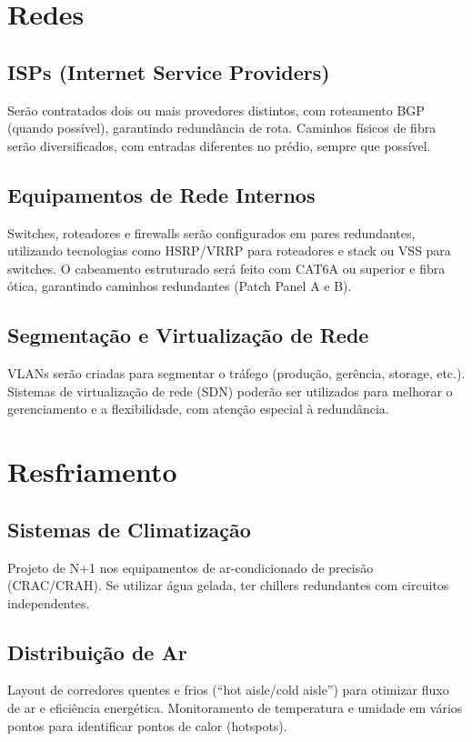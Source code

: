 \documentclass[
	12pt,				%
	oneside,			%
	a4paper,			%
	english,			%
	brazil				%
	]{abntex2unama}
\begin{document}
\section{Redes}
\subsection{ISPs (Internet Service Providers)}
Serão contratados dois ou mais provedores distintos, com roteamento BGP (quando possível), garantindo redundância de rota. Caminhos físicos de fibra serão diversificados, com entradas diferentes no prédio, sempre que possível.

\subsection{Equipamentos de Rede Internos}
Switches, roteadores e firewalls serão configurados em pares redundantes, utilizando tecnologias como HSRP/VRRP para roteadores e stack ou VSS para switches. O cabeamento estruturado será feito com CAT6A ou superior e fibra ótica, garantindo caminhos redundantes (Patch Panel A e B).

\subsection{Segmentação e Virtualização de Rede}
VLANs serão criadas para segmentar o tráfego (produção, gerência, storage, etc.). Sistemas de virtualização de rede (SDN) poderão ser utilizados para melhorar o gerenciamento e a flexibilidade, com atenção especial à redundância.

\section{Resfriamento}
\subsection{Sistemas de Climatização}
Projeto de N+1 nos equipamentos de ar-condicionado de precisão (CRAC/CRAH). Se utilizar água gelada, ter chillers redundantes com circuitos independentes.

\subsection{Distribuição de Ar}
Layout de corredores quentes e frios (“hot aisle/cold aisle”) para otimizar fluxo de ar e eficiência energética. Monitoramento de temperatura e umidade em vários pontos para identificar pontos de calor (hotspots).
\end{document}
